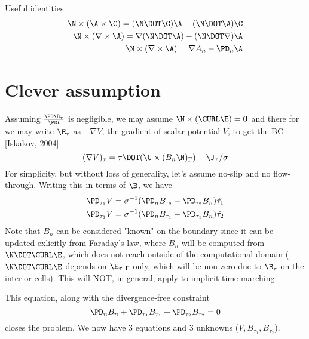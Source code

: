 \documentclass[11pt]{article}
\begin{document}
Useful identities
\begin{equation}\begin{aligned}
  \N \times (\A \times \C) = (\N \DOT \C) \A - (\N \DOT \A) \C \\
  \N \times (\nabla \times \A) = \nabla(\N \DOT \A) - (\N \DOT \nabla) \A \\
  \N \times (\nabla \times \A) = \nabla A_n - \PD_n \A \\
\end{aligned}\end{equation}

\newpage
\section{Clever assumption}
Assuming $\frac{\PD \B_{\tau}}{\PD t}$ is negligible, we may assume $\N \times (\CURL \E) = \mathbf{0}$ and there for we may write $\E_{\tau}$ as $-\nabla V$, the gradient of scalar potential $V$, to get the BC [Iskakov, 2004]
\begin{equation}
  (\nabla V)_{\tau} = \tau \DOT (\U \times (B_n \N)_\Gamma) - \J_{\tau}/\sigma
\end{equation}
For simplicity, but without loss of generality, let's assume no-slip and no flow-through. Writing this in terms of $\B$, we have
\begin{equation}
\begin{aligned}
  \PD_{\tau_1} V = \sigma^{-1}(\PD_n B_{\tau_2} - \PD_{\tau_2} B_n) \hat{\tau_1} \\
  \PD_{\tau_2} V = \sigma^{-1} (\PD_n B_{\tau_1} - \PD_{\tau_1} B_n) \hat{\tau_2} \\
\end{aligned}
\end{equation}
Note that $B_n$ can be considered "known" on the boundary since it can be updated exlicitly from Faraday's law, where $B_n$ will be computed from $\N \DOT \CURL \E$, which does not reach outside of the computational domain ($\N \DOT \CURL \E$ depends on $\E_{\tau}|_{\Gamma}$ only, which will be non-zero due to $\B_{\tau}$ on the interior cells). This will NOT, in general, apply to implicit time marching.

This equation, along with the divergence-free constraint
\begin{equation}
  \PD_n B_n + \PD_{\tau_1} B_{\tau_1} + \PD_{\tau_2} B_{\tau_2} = 0
\end{equation}
closes the problem. We now have 3 equations and 3 unknowns ($V,B_{\tau_1},B_{\tau_2}$).
\end{document}
